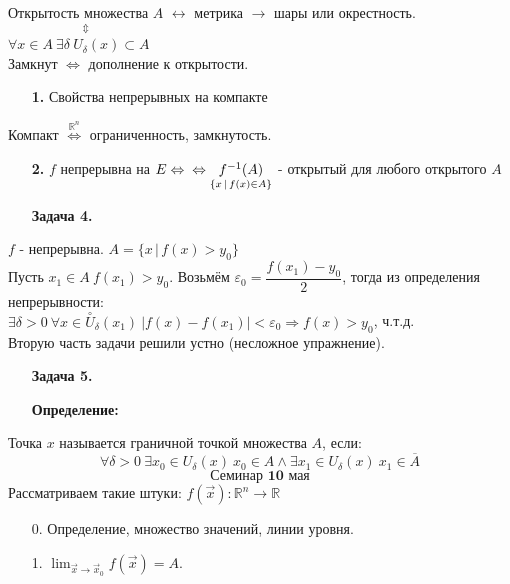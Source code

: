 \documentclass[12pt, letterpaper, twoside]{article}
\newcommand{\DS}{\displaystyle}
\newcommand{\Abs}[1]{\left| #1 \right|}
\begin{document}
    $\underset{\Updownarrow}{\text{Открытость множества $A$}}$ $\longleftrightarrow$ метрика $\longrightarrow$ шары или окрестность.\\
    $\forall x\in A\ \exists \delta\ U_{\delta}(x)\subset A$\\
    Замкнут $\Leftrightarrow$ дополнение к открытости.
    \begin{enumerate}
        \item[\textbf{1.}] Свойства непрерывных на компакте
    \end{enumerate}
    Компакт $\overset{\mathbb{R}^n}{\Longleftrightarrow}$ ограниченность, замкнутость.
    \begin{enumerate}
        \item[\textbf{2.}] $f$ непрерывна на $E\Leftrightarrow\\
        \Leftrightarrow \underset{\{x\, |\, f(x)\in A\}}{f^{-1}(A)}$ - открытый для любого открытого $A$
    \end{enumerate}
    \begin{enumerate}
        \item[\textbf{Задача 4.}]
    \end{enumerate}
    $f$ - непрерывна. $A = \{x\, |\, f(x) > y_0\}$\\
    Пусть $x_1\in A\ f(x_1) > y_0$. Возьмём $\varepsilon_0 = \dfrac{f(x_1) - y_0}{2}$, тогда из определения непрерывности:\\
    $\exists \delta > 0\ \forall x\in \overset{\circ}{U}_{\delta}(x_1)\ \Abs{f(x) - f(x_1)} < \varepsilon_0\Rightarrow f(x) > y_0$, ч.т.д.\\
    Вторую часть задачи решили устно (несложное упражнение).
    \begin{enumerate}
        \item[\textbf{Задача 5.}]
    \end{enumerate}
    \begin{enumerate}
        \item[\textbf{Определение:}]
    \end{enumerate}
    Точка $x$ называется граничной точкой множества $A$, если:
    \[\forall \delta>0\ \exists x_0 \in U_{\delta}(x)\ x_0\in A \wedge \exists x_1 \in U_{\delta}(x)\ x_1 \in \overline{A}\]
    \[\textbf{Семинар 10 мая}\]
    Рассматриваем такие штуки: $f(\vec{x}): \mathbb{R}^n \to \mathbb{R}$
    \begin{enumerate}
        \item[0.] Определение, множество значений, линии уровня.
        \item[1.] $\DS \lim_{\vec{x}\to \vec{x}_0} f(\vec{x}) = A$.  
    \end{enumerate}
\end{document}
